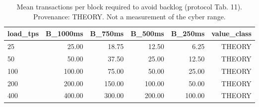 \begin{table}[t]
\caption{Mean transactions per block required to avoid backlog (protocol Tab. 11). Provenance: THEORY.  Not a measurement of the cyber range.}
\label{tab:table11_tx_per_block}
\centering
\begin{tabular}{lrrrrr}
\hline
load\_tps & B\_1000ms & B\_750ms & B\_500ms & B\_250ms & value\_class \\
\hline
25 & 25.00 & 18.75 & 12.50 & 6.25 & THEORY \\
50 & 50.00 & 37.50 & 25.00 & 12.50 & THEORY \\
100 & 100.00 & 75.00 & 50.00 & 25.00 & THEORY \\
200 & 200.00 & 150.00 & 100.00 & 50.00 & THEORY \\
400 & 400.00 & 300.00 & 200.00 & 100.00 & THEORY \\
\hline
\end{tabular}
\end{table}
